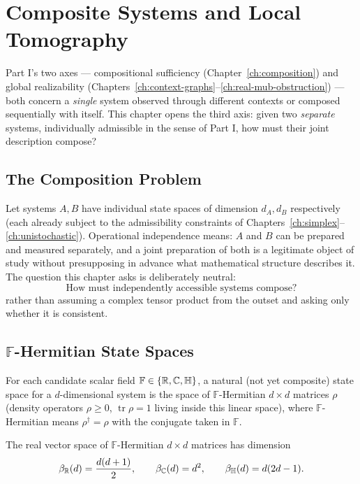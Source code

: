 \chapter{Composite Systems and Local Tomography}
\label{ch:local-tomography}

Part I's two axes — compositional sufficiency (Chapter~\ref{ch:composition})
and global realizability (Chapters~\ref{ch:context-graphs}--\ref{ch:real-mub-obstruction})
— both concern a \emph{single} system observed through different contexts or
composed sequentially with itself. This chapter opens the third axis: given
two \emph{separate} systems, individually admissible in the sense of Part I,
how must their joint description compose?

\section{The Composition Problem}

Let systems $A,B$ have individual state spaces of dimension $d_A,d_B$
respectively (each already subject to the admissibility constraints of
Chapters~\ref{ch:simplex}--\ref{ch:unistochastic}). Operational independence
means: $A$ and $B$ can be prepared and measured separately, and a joint
preparation of both is a legitimate object of study without presupposing in
advance what mathematical structure describes it. The question this chapter
asks is deliberately neutral:
\begin{equation}
\boxed{\text{How must independently accessible systems compose?}}
\end{equation}
rather than assuming a complex tensor product from the outset and asking only
whether it is consistent.

\section{\texorpdfstring{$\mathbb F$}{F}-Hermitian State Spaces}

For each candidate scalar field $\mathbb F \in \{\mathbb{R},\mathbb{C},\mathbb{H}\}$, a natural
(not yet composite) state space for a $d$-dimensional system is the space of
$\mathbb F$-Hermitian $d\times d$ matrices $\rho$ (density operators
$\rho\ge0$, $\operatorname{tr}\rho=1$ living inside this linear space), where
$\mathbb F$-Hermitian means $\rho^\dagger=\rho$ with the conjugate taken in
$\mathbb F$.

\begin{proposition}
\label{prop:hermitian-dimension}
The real vector space of $\mathbb F$-Hermitian $d\times d$ matrices has
dimension
\begin{equation}
\beta_{\mathbb{R}}(d) = \frac{d(d+1)}{2}, \qquad
\beta_{\mathbb{C}}(d) = d^2, \qquad
\beta_{\mathbb{H}}(d) = d(2d-1).
\end{equation}
\end{proposition}

